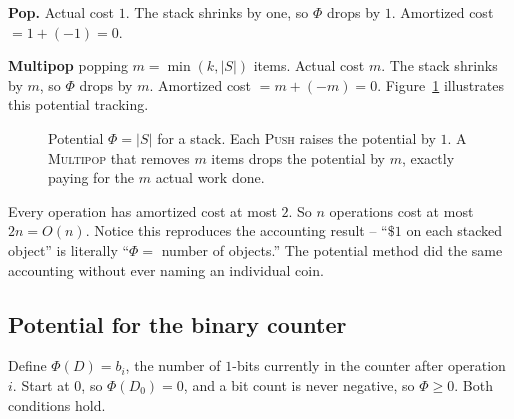 \textbf{Pop.} Actual cost $1$. The stack shrinks by one, so $\Phi$ drops by $1$.
Amortized cost $= 1 + (-1) = 0$.

\textbf{Multipop} popping $m = \min(k, |S|)$ items. Actual cost $m$. The stack
shrinks by $m$, so $\Phi$ drops by $m$. Amortized cost $= m + (-m) = 0$. Figure~\ref{fig:stack-potential} illustrates this potential tracking.

\begin{figure}[htbp]
\centering
{}
\caption{Potential $\Phi = |S|$ for a stack. Each \textsc{Push} raises the potential by $1$. A \textsc{Multipop} that removes $m$ items drops the potential by $m$, exactly paying for the $m$ actual work done.}
\label{fig:stack-potential}
\end{figure}

Every operation has amortized cost at most $2$. So $n$ operations cost at most
$2n = O(n)$. Notice this reproduces the accounting result -- ``$\$1$ on each
stacked object'' is literally ``$\Phi = $ number of objects.'' The potential method
did the same accounting without ever naming an individual coin.

\subsection{Potential for the binary counter}

Define $\Phi(D) = b_i$, the number of $1$-bits currently in the counter after
operation $i$. Start at $0$, so $\Phi(D_0) = 0$, and a bit count is never negative,
so $\Phi \ge 0$. Both conditions hold.

